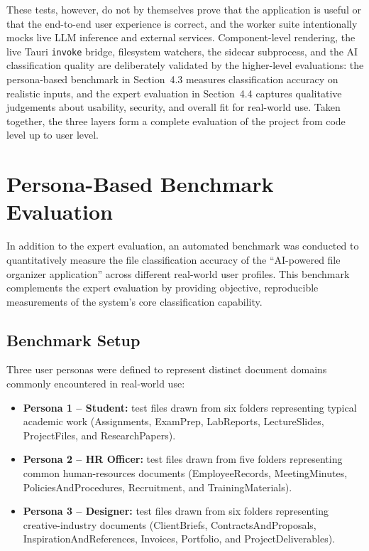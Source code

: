 \documentclass[12pt,oneside,openright,a4paper]{cpe-english-project}
\begin{document}
These tests, however, do not by themselves prove that the application is useful or that the end-to-end user experience is correct, and the worker suite intentionally mocks live LLM inference and external services. Component-level rendering, the live Tauri \texttt{invoke} bridge, filesystem watchers, the sidecar subprocess, and the AI classification quality are deliberately validated by the higher-level evaluations: the persona-based benchmark in Section~4.3 measures classification accuracy on realistic inputs, and the expert evaluation in Section~4.4 captures qualitative judgements about usability, security, and overall fit for real-world use. Taken together, the three layers form a complete evaluation of the project from code level up to user level.

\section{Persona-Based Benchmark Evaluation}
In addition to the expert evaluation, an automated benchmark was conducted to quantitatively measure the file classification accuracy of the ``AI-powered file organizer application'' across different real-world user profiles. This benchmark complements the expert evaluation by providing objective, reproducible measurements of the system's core classification capability.

\subsection*{Benchmark Setup}
Three user personas were defined to represent distinct document domains commonly encountered in real-world use:

\begin{itemize}
\item \textbf{Persona 1 -- Student:} test files drawn from six folders representing typical academic work (Assignments, ExamPrep, LabReports, LectureSlides, ProjectFiles, and ResearchPapers).
\item \textbf{Persona 2 -- HR Officer:} test files drawn from five folders representing common human-resources documents (EmployeeRecords, MeetingMinutes, PoliciesAndProcedures, Recruitment, and TrainingMaterials).
\item \textbf{Persona 3 -- Designer:} test files drawn from six folders representing creative-industry documents (ClientBriefs, ContractsAndProposals, InspirationAndReferences, Invoices, Portfolio, and ProjectDeliverables).
\end{itemize}
\end{document}
